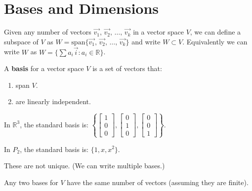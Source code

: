 \documentclass[../main.tex]{subfiles}
\begin{document}

\section{Bases and Dimensions}

Given any number of vectors \( \vec{v_1}, \, \vec{v_2}, \, \dots, \, \vec{v_k} \) in a vector space \( V \),
we can define a subspace of \( V \) as \( W = \text{span} \{ \vec{v_1}, \, \vec{v_2}, \, \dots, \, \vec{v_k} \} \)
and write \( W \subset V \).
Equivalently we can write \( W \) as \( W = \{\sum a_i \vec{i}: a_i \in \mathbb{R} \} \).

\begin{definition}[Basis]
    A \textbf{basis} for a vector space \( V \) is a set of vectors that:
    \begin{enumerate}
        \item span \( V \).
        \item are linearly independent.
    \end{enumerate}
\end{definition}

\begin{example}[]
    In \( \mathbb{R}^3 \), the standard basis is:
    \( \left\{
        \begin{bmatrix} 1 \\ 0 \\ 0 \end{bmatrix},
        \begin{bmatrix} 0 \\ 1 \\ 0 \end{bmatrix},
        \begin{bmatrix} 0 \\ 0 \\ 1 \end{bmatrix}
    \right\} \).

    In \( P_2 \), the standard basis is: \( \{1,x,x^2\} \).
\end{example}

\begin{note}
    These are not unique. (We can write multiple bases.)
\end{note}

\begin{theorem}[]
    Any two bases for \( V \) have the same number of vectors (assuming they are finite).
\end{theorem}
\end{document}
